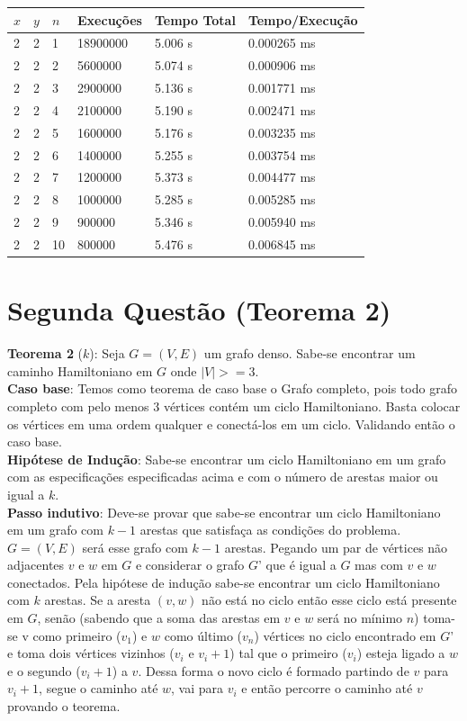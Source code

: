 \documentclass{article}
\begin{document}
\begin{table}[H]
\centering
\begin{tabular}{l|l|l|l|l|l}
$x$ & $y$ & $n$ & Execuções & Tempo Total & Tempo/Execução \\\hline
2 & 2 & 1 & 18900000 & 5.006 s & 0.000265 ms \\
2 & 2 & 2 & 5600000 & 5.074 s & 0.000906 ms \\
2 & 2 & 3 & 2900000 & 5.136 s & 0.001771 ms \\
2 & 2 & 4 & 2100000 & 5.190 s & 0.002471 ms \\
2 & 2 & 5 & 1600000 & 5.176 s & 0.003235 ms \\
2 & 2 & 6 & 1400000 & 5.255 s & 0.003754 ms \\
2 & 2 & 7 & 1200000 & 5.373 s & 0.004477 ms \\
2 & 2 & 8 & 1000000 & 5.285 s & 0.005285 ms \\
2 & 2 & 9 & 900000 & 5.346 s & 0.005940 ms \\
2 & 2 & 10 & 800000 & 5.476 s & 0.006845 ms \\
\end{tabular}
\end{table}

\pagebreak

\section{Segunda Questão (Teorema 2)}

\textbf{Teorema 2} ($k$): Seja $G = (V, E)$ um grafo denso. Sabe-se encontrar um caminho Hamiltoniano em $G$ onde $|V| >= 3$.\\

\textbf{Caso base}: Temos como teorema de caso base o Grafo completo, pois todo grafo completo com pelo menos $3$ vértices contém um ciclo Hamiltoniano. Basta colocar os vértices em uma ordem qualquer e conectá-los em um ciclo. Validando então o caso base.\\

\textbf{Hipótese de Indução}: Sabe-se encontrar um ciclo Hamiltoniano em um grafo com as especificações especificadas acima e com o número de arestas maior ou igual a $k$.\\

\textbf{Passo indutivo}: Deve-se provar que sabe-se encontrar um ciclo Hamiltoniano em um grafo com $k-1$ arestas que satisfaça as condições do problema. $G = (V,E)$ será esse grafo com $k-1$ arestas. Pegando um par de vértices não adjacentes $v$ e $w$ em $G$ e considerar o grafo $G$’ que é igual a $G$ mas com $v$ e $w$ conectados. Pela hipótese de indução sabe-se encontrar um ciclo Hamiltoniano com $k$ arestas. Se a aresta $(v,w)$ não está no ciclo então esse ciclo está presente em $G$, senão (sabendo que a soma das arestas em $v$ e $w$ será no mínimo $n$) toma-se v como primeiro ($v_1$) e $w$ como último ($v_n$) vértices no ciclo encontrado em $G$’ e toma dois vértices vizinhos ($v_i$ e $v_i+1$) tal que o primeiro ($v_i$) esteja ligado a $w$ e o segundo ($v_i+1$) a $v$. Dessa forma o novo ciclo é formado partindo de $v$ para $v_i+1$, segue o caminho até $w$, vai para $v_i$ e então percorre o caminho até $v$ provando o teorema.\\
\end{document}
